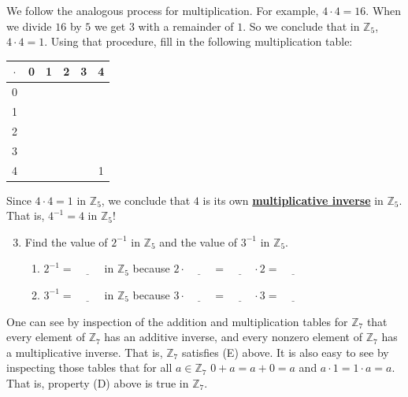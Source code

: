 \documentclass[11pt]{article}
\newenvironment{task}
	{\begin{mdframed}[linecolor=lightgray, linewidth=3pt]\raggedright}
	{\end{mdframed}}
\renewcommand\emph[1]{\underline{\bf{#1}}} %
\theoremstyle{definition}
\begin{document}
\begin{task}
  We follow the analogous process for multiplication. For example, $4 \cdot 4 = 16$. When we divide $16$ by $5$ we get $3$ with a remainder of $1$. So we
  conclude that in $\mathbb{Z}_5$, $4 \cdot 4 = 1$. Using that procedure, fill in the following multiplication table:

  \begin{center}
    \begin{tabular}{|c|c|c|c|c|c|}\\ \hline
      $\cdot$ & 0 & 1 & 2 & 3 & 4 \\ \hline
      0   &   &   &   &   &   \\ \hline
      1   &   &   &   &   &   \\ \hline
      2   &   &   &   &   &   \\ \hline
      3   &   &   &   &   &   \\ \hline
      4   &   &   &   &   & 1 \\ \hline
    \end{tabular}
  \end{center}

  Since $4\cdot 4 = 1$ in $\mathbb{Z}_5$, we conclude that $4$ is its own \emph{multiplicative inverse} in $\mathbb{Z}_5$. That is, $4^{-1}=4$ in $\mathbb{Z}_5$!

    \begin{enumerate}
        \setcounter{enumi}{2}
      \item Find the value of $2^{-1}$ in $\mathbb{Z}_5$ and the value of $3^{-1}$ in $\mathbb{Z}_5$. 
        \begin{enumerate}
          \item $2^{-1}=\underline{\hspace{1cm}}$ in $\mathbb{Z}_5$ because $2\cdot \underline{\hspace{1cm}} = \underline{\hspace{1cm}}\cdot 2 = \underline{\hspace{1cm}}$
          \item $3^{-1}=\underline{\hspace{1cm}}$ in $\mathbb{Z}_5$ because $3\cdot \underline{\hspace{1cm}} = \underline{\hspace{1cm}}\cdot 3 = \underline{\hspace{1cm}}$
        \end{enumerate}
    \end{enumerate}

    One can see by inspection of the addition and multiplication tables for $\mathbb{Z}_7$ that every element of $\mathbb{Z}_7$ has an additive inverse, and
    every nonzero element of $\mathbb{Z}_7$ has a multiplicative inverse. That is, $\mathbb{Z}_7$ satisfies (E) above. It is also easy to see by 
    inspecting those tables that for all $a\in \mathbb{Z}_7$ $0+a=a+0 = a$ and $a\cdot 1 = 1 \cdot a = a$. That is, property (D) above is true 
    in $\mathbb{Z}_7$. 


\end{task}
\end{document}
